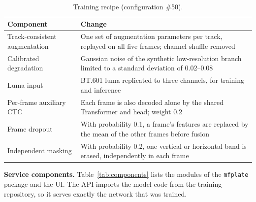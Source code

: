 \documentclass[11pt,a4paper]{article}
\begin{document}
\begin{table}[H]
\centering\small
\caption{Training recipe (configuration \#50).}\label{tab:recipe}
\begin{tabularx}{\textwidth}{@{}P{3.5cm}L@{}}
\toprule
Component & Change \\
\midrule
Track-consistent augmentation & One set of augmentation parameters per track, replayed on all five frames; channel shuffle removed \\
Calibrated degradation & Gaussian noise of the synthetic low-resolution branch limited to a standard deviation of 0.02--0.08 \\
Luma input & BT.601 luma replicated to three channels, for training and inference \\
Per-frame auxiliary CTC & Each frame is also decoded alone by the shared Transformer and head; weight 0.2 \\
Frame dropout & With probability 0.1, a frame's features are replaced by the mean of the other frames before fusion \\
Independent masking & With probability 0.2, one vertical or horizontal band is erased, independently in each frame \\
\bottomrule
\end{tabularx}
\end{table}

\textbf{Service components.} Table~\ref{tab:components} lists the modules of the \texttt{mfplate} package and the UI. The API imports the model code from the training repository, so it serves exactly the network that was trained.
\end{document}
